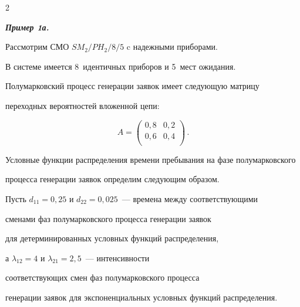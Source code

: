 \begin{multicols}{2}

















{\bfseries\textit{Пример 1а.}}


Рассмотрим СМО $SM_2/PH_2/8/5$ c надежными приборами.


В системе имеется 8~идентичных приборов и 5~мест ожидания.


Полумарковский процесс генерации заявок имеет следующую матрицу


переходных вероятностей вложенной цепи:


$$


A=


\begin{pmatrix}


0{,}8 & 0{,}2\\


0{,}6 & 0{,}4\\


\end{pmatrix}\,.


$$


Условные функции распределения времени пребывания на фазе полумарковского


процесса генерации заявок определим следующим образом.


Пусть $d_{11}=0{,}25$ и $d_{22}=0{,}025$~--- времена между соответствующими


сменами фаз полумарковского процесса генерации заявок


для детерминированных условных функций распределения,


а $\lambda_{12}=4$ и $\lambda_{21}=2{,}5$~--- интенсивности


соответствующих смен фаз полумарковского процесса


генерации заявок для экспоненциальных условных функций распределения.



\end{multicols}
